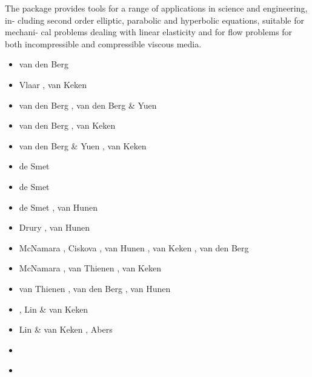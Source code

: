 \begin{itemize}
The package provides tools for a range of applications in science and engineering, in-
cluding second order elliptic, parabolic and hyperbolic equations, suitable for mechani-
cal problems dealing with linear elasticity and for flow problems for both incompressible
and compressible viscous media.

\begin{scriptsize}
\begin{itemize}
\item[\nineteenninetythree] van den Berg \etal \cite{beky93,vavy93}
\item[\nineteenninetyfour] Vlaar \etal \cite{vlvv94}, van Keken \etal \cite{vayv94}
\item[\nineteenninetyfive] van den Berg \etal \cite{vayv95}, van den Berg \& Yuen \cite{vayu95}
\item[\nineteenninetysix] van den Berg \etal \cite{vayu96}, van Keken \etal \cite{vaky96}
\item[\nineteenninetyseven] van den Berg \& Yuen \cite{vayu97}, van Keken \cite{vank97}
\item[\nineteenninetyeight] de Smet \etal \cite{devv98}
\item[\nineteenninetynine] de Smet \etal \cite{devv99}
\item[\twothousand] de Smet \etal \cite{devv00b}, van Hunen \etal \cite{vavv00}
\item[\twothousandone] Drury \etal \cite{drvc01}, van Hunen \etal \cite{vavv01}
\item[\twothousandtwo] McNamara \etal \cite{mcvk02}, Ciskova \etal \cite{civv02},
                       van Hunen \etal \cite{vavv02,vavv02b}, van Keken \etal \cite{vakp02},
                       van den Berg \etal \cite{vaya02}
\item[\twothousandthree] McNamara \etal \cite{mcvk03}, van Thienen \etal \cite{vavd03},
                         van Keken \etal \cite{vabh03}
\item[\twothousandfour] van Thienen \etal \cite{vavv04,vavv04b,vavv04c}, van den Berg \etal \cite{vayr04},
                        van Hunen \etal \cite{vavv04d}
\item[\twothousandfive] \cite{vavv05}\cite{sepr05}\cite{vary05}, Lin \& van Keken \cite{liva05}
\item[\twothousandsix] Lin \& van Keken \cite{liva06a,liva06b}, Abers \etal \cite{abvk06}
\item[\twothousandseven] \cite{vant07}\cite{civv07}\cite{brva07a}\cite{brva07b}\cite{knvk07}
\item[\twothousandeight] \cite{plva08}\cite{brhv08}\cite{knva08}\cite{vava08}

\end{itemize}
\end{scriptsize}
\end{itemize}
